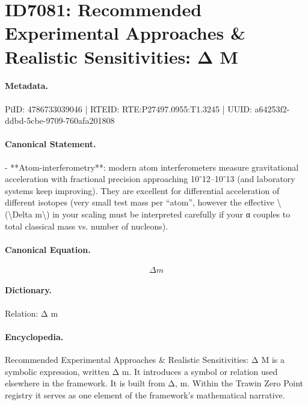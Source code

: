 \section*{ID7081: Recommended Experimental Approaches \& Realistic Sensitivities: Δ M}
\paragraph{Metadata.}
PiID: 4786733039046 | RTEID: RTE:P27497.0955:T1.3245 | UUID: a64253f2-ddbd-5cbe-9709-760afa201808

\paragraph{Canonical Statement.}
- **Atom-interferometry**: modern atom interferometers measure gravitational acceleration with fractional precision approaching 10⁻12–10⁻13 (and laboratory systems keep improving). They are excellent for differential acceleration of different isotopes (very small test mass per “atom”, however the effective \textbackslash{}(\textbackslash{}Delta m\textbackslash{}) in your scaling must be interpreted carefully if your α couples to total classical mass vs. number of nucleons).

\paragraph{Canonical Equation.}
\[
\Delta m
\]

\paragraph{Dictionary.}
Relation: Δ m

\paragraph{Encyclopedia.}
Recommended Experimental Approaches \& Realistic Sensitivities: Δ M is a symbolic expression, written Δ m. It introduces a symbol or relation used elsewhere in the framework. It is built from Δ, m. Within the Trawin Zero Point registry it serves as one element of the framework's mathematical narrative.
